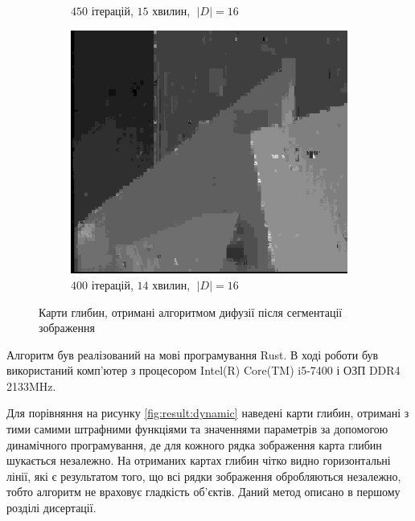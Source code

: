 \begin{figure}[h]
\begin{subfigure}[t]{0.32\textwidth}
        \caption{$450$ ітерацій, $15$ хвилин, $\; \left| D \right| = 16$}
        \label{fig:flowerpots:superpixel}
    \end{subfigure}
    \hfill
    \begin{subfigure}[t]{0.32\textwidth}
        \centering
        \includegraphics[width=\textwidth]{images/poster_superpixel_based_stereo}
        \caption{$400$ ітерацій, $14$ хвилин, $\; \left| D \right| = 16$}
        \label{fig:poster:superpixel}
    \end{subfigure}
    \caption{Карти глибин, отримані алгоритмом дифузії після сегментації зображення}
    \label{fig:result:superpixel}
\end{figure}

Алгоритм був реалізований на мові програмування Rust.
В ході роботи був використаний комп'ютер з процесором
Intel(R) Core(TM) i5-7400 і ОЗП DDR4 2133MHz.

Для порівняння на рисунку \ref{fig:result:dynamic}
наведені карти глибин,
отримані з тими самими штрафними функціями
та значеннями параметрів за допомогою динамічного програмування,
де для кожного рядка зображення карта глибин шукається незалежно.
На отриманих картах глибин чітко видно горизонтальні лінії,
які є результатом того, що всі рядки зображення обробляються незалежно,
тобто алгоритм не враховує гладкість об'єктів.
Даний метод описано в першому розділі дисертації.

